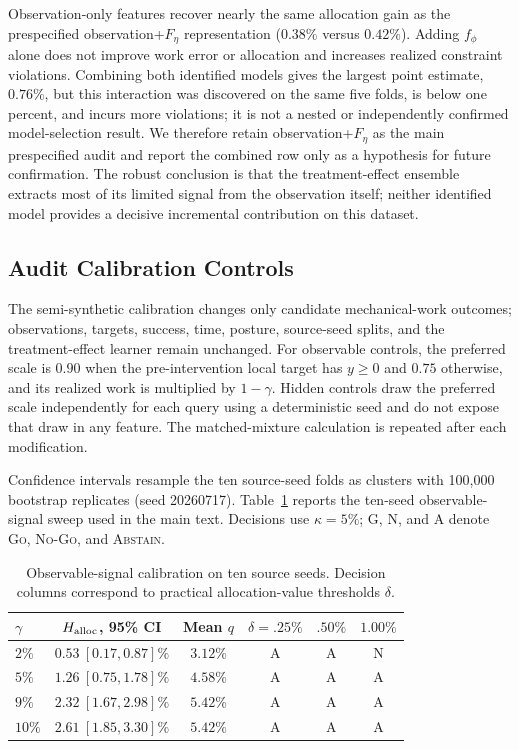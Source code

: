 Observation-only features recover nearly the same allocation gain as the
prespecified observation+$F_\eta$ representation ($0.38\%$ versus $0.42\%$).
Adding $f_\phi$ alone does not improve work error or allocation and increases
realized constraint violations. Combining both identified models gives the
largest point estimate, $0.76\%$, but this interaction was discovered on the
same five folds, is below one percent, and incurs more violations; it is not a
nested or independently confirmed model-selection result. We therefore retain
observation+$F_\eta$ as the main prespecified audit and report the combined row
only as a hypothesis for future confirmation. The robust conclusion is that
the treatment-effect ensemble extracts most of its limited signal from the
observation itself; neither identified model provides a decisive incremental
contribution on this dataset.

\subsection{Audit Calibration Controls}
\label{app:audit-controls}

The semi-synthetic calibration changes only candidate mechanical-work outcomes;
observations, targets, success, time, posture, source-seed splits, and the
treatment-effect learner remain unchanged. For observable controls, the
preferred scale is $0.90$ when the pre-intervention local target has
$y\ge0$ and $0.75$ otherwise, and its realized work is multiplied by
$1-\gamma$. Hidden controls draw the preferred scale independently for each
query using a deterministic seed and do not expose that draw in any feature.
The matched-mixture calculation is repeated after each modification.

Confidence intervals resample the ten source-seed folds as clusters with
100{,}000 bootstrap replicates (seed 20260717). Table~\ref{tab:control-curve}
reports the ten-seed observable-signal sweep used in the main text. Decisions
use $\kappa=5\%$; G, N, and A denote \textsc{Go}, \textsc{No-Go}, and
\textsc{Abstain}.

\begin{table}[h]
\centering
\caption{Observable-signal calibration on ten source seeds. Decision columns correspond to practical allocation-value thresholds $\delta$.}
\label{tab:control-curve}
\begin{tabular}{lccccc}
\toprule
$\gamma$ & $H_{\rm alloc}$, 95\% CI & Mean $q$ & $\delta=.25\%$ & $.50\%$ & $1.00\%$ \\
\midrule
$2\%$  & $0.53\ [0.17,0.87]\%$ & $3.12\%$ & A & A & N \\
$5\%$  & $1.26\ [0.75,1.78]\%$ & $4.58\%$ & A & A & A \\
$9\%$  & $2.32\ [1.67,2.98]\%$ & $5.42\%$ & A & A & A \\
$10\%$ & $2.61\ [1.85,3.30]\%$ & $5.42\%$ & A & A & A \\
\bottomrule
\end{tabular}
\end{table}

